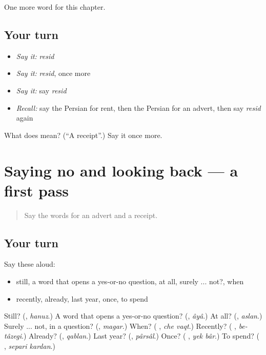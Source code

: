 \begin{grammarlens}[title={What you've built}]
One more word for this chapter.
\end{grammarlens}

\subsection*{Your turn}
\begin{itemize}
\raggedright
  \item \emph{Say it:} \emph{resid}
  \item \emph{Say it:} \emph{resid}, once more
  \item \emph{Say it:} say \emph{resid}
  \item \emph{Recall:} say the Persian for rent, then the Persian for an advert, then say \emph{resid} again
\end{itemize}

\begin{tcolorbox}[breakable,colback=teal!4,colframe=teal!35!black,title={Before you move on}]
What does  mean? (\textquotedblleft{}A receipt\textquotedblright{}.) Say it once more.
\end{tcolorbox}
\section[(dialogue)]{Saying no and looking back — a first pass}

\label{lesson:FA-R139-first-pass-saying-no-and-looking-back}



\begin{quote}
Say the words for an advert and a receipt.
\end{quote}

\subsection*{Your turn}
Say these aloud:

\begin{itemize}
\raggedright
  \item still, a word that opens a yes-or-no question, at all, surely ... not?, when
  \item recently, already, last year, once, to spend
\end{itemize}

\begin{tcolorbox}[breakable,colback=teal!4,colframe=teal!35!black,title={Before you move on}]
Still? (\textbf{}, \emph{hanuz}.) A word that opens a yes-or-no question? (\textbf{}, \emph{âyâ}.) At all? (\textbf{}, \emph{aslan}.) Surely ... not, in a question? (\textbf{}, \emph{magar}.) When? (\textbf{ }, \emph{che vaqt}.) Recently? (\textbf{ }, \emph{be-tâzegi}.) Already? (\textbf{}, \emph{qablan}.) Last year? (\textbf{}, \emph{pârsâl}.) Once? (\textbf{ }, \emph{yek bâr}.) To spend? (\textbf{ }, \emph{separi kardan}.)
\end{tcolorbox}
